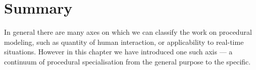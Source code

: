 \section{Summary}
\label{s:readingsSummary}



In general there are many axes on which we can classify the work on procedural modeling, such as quantity of human interaction, or applicability to real-time situations. 
However in this chapter we have introduced one such axis --- a continuum of procedural specialisation from the general purpose to the specific. 


